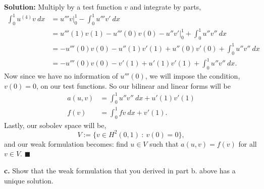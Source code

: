 \documentclass[11pt]{article}
\begin{document}
\vskip 1cm


\textbf{Solution:} Multiply by a test function $v$ and integrate by parts,
\begin{align*}
    \int_0^1 u^{(4)} v \: dx &= u''' v \Big|_0^1 - \int_0^1 u''' v' \: dx \\
    &= u'''(1) v(1) - u'''(0) v(0) - u'' v'\Big|_0^1 + \int_0^1 u'' v'' \: dx \\
    &= -u'''(0) v(0) - u''(1) v'(1) + u''(0) v'(0) + \int_0^1 u'' v'' \: dx \\
	&= - u'''(0) v(0) -v'(1) + u'(1) v'(1) + \int_0^1 u'' v'' \: dx.
\end{align*}
Now since we have no information of $u'''(0)$, we will impose the condition, $v(0) = 0$, on our test functions.
So our bilinear and linear forms will be 
\begin{align*}
    a(u,v) &= \int_0^1 u'' v'' \: dx + u'(1) v'(1) \\
	f(v) &= \int_0^1 f v \: dx + v'(1).
\end{align*}
Lastly, our sobolev space will be,
\begin{equation*}
    V := \{ v \in H^2(0,1) \: : \: v(0) = 0 \},
\end{equation*}
and our weak formulation becomes: find $u \in V$ such that $a(u,v) = f(v)$ for all $v \in V$.
$\blacksquare$




\vskip 2cm


\textbf{c.} Show that the weak formulation that you derived in part b. above has a unique solution.


\vskip 1cm
\end{document}

